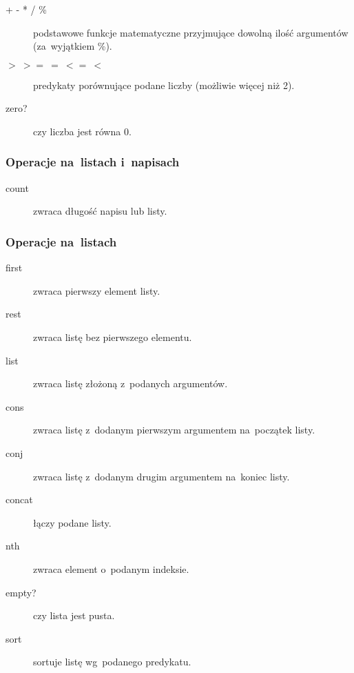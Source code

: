 \documentclass[a4paper,11pt]{article}
\newcommand{\clj}[1]{
\inputminted[fontsize=\footnotesize,frame=single,samepage=true]{clojure}{code/#1.clj}
}
\begin{document}
\begin{description}
\item[+ - * / \%] podstawowe funkcje matematyczne przyjmujące dowolną ilość
  argumentów (za~wyjątkiem \%).

\item[$> \ >= \ = \ <= \ <$] predykaty porównujące podane liczby (możliwie
  więcej niż 2).

\item[zero?] czy liczba jest równa 0.
\end{description}

\subsubsection{Operacje na~listach i~napisach}

\begin{description}
\item[count] zwraca długość napisu lub listy.
\end{description}

\subsubsection{Operacje na~listach}

\begin{description}
\item[first] zwraca pierwszy element listy.

\item[rest] zwraca listę bez pierwszego elementu.

\item[list] zwraca listę złożoną z~podanych argumentów.

\item[cons] zwraca listę z~dodanym pierwszym argumentem na~początek listy.

\item[conj] zwraca listę z~dodanym drugim argumentem na~koniec listy.

\item[concat] łączy podane listy.

\item[nth] zwraca element o~podanym indeksie.

\item[empty?] czy lista jest pusta.

\item[sort] sortuje listę wg~podanego predykatu.
  \clj{sort}

\end{description}
\end{document}
